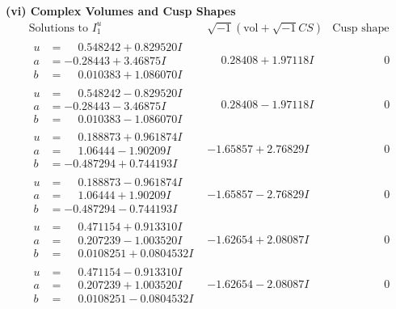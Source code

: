 \documentclass[1p]{elsarticle_modified}
\theoremstyle{definition}
\newcommand{\I}{\sqrt{-1}}
\begin{document}
\newpage\flushleft \textbf{(vi) Complex Volumes and Cusp Shapes}
$$\begin{array}{c|c|c}  
\text{Solutions to }I^u_{1}& \I (\text{vol} + \sqrt{-1}CS) & \text{Cusp shape}\\
 \hline 
\begin{aligned}
u &= \phantom{-}0.548242 + 0.829520 I \\
a &= -0.28443 + 3.46875 I \\
b &= \phantom{-}0.010383 + 1.086070 I\end{aligned}
 & \phantom{-}0.28408 + 1.97118 I & \phantom{-0.000000 } 0 \\ \hline\begin{aligned}
u &= \phantom{-}0.548242 - 0.829520 I \\
a &= -0.28443 - 3.46875 I \\
b &= \phantom{-}0.010383 - 1.086070 I\end{aligned}
 & \phantom{-}0.28408 - 1.97118 I & \phantom{-0.000000 } 0 \\ \hline\begin{aligned}
u &= \phantom{-}0.188873 + 0.961874 I \\
a &= \phantom{-}1.06444 - 1.90209 I \\
b &= -0.487294 + 0.744193 I\end{aligned}
 & -1.65857 + 2.76829 I & \phantom{-0.000000 } 0 \\ \hline\begin{aligned}
u &= \phantom{-}0.188873 - 0.961874 I \\
a &= \phantom{-}1.06444 + 1.90209 I \\
b &= -0.487294 - 0.744193 I\end{aligned}
 & -1.65857 - 2.76829 I & \phantom{-0.000000 } 0 \\ \hline\begin{aligned}
u &= \phantom{-}0.471154 + 0.913310 I \\
a &= \phantom{-}0.207239 - 1.003520 I \\
b &= \phantom{-}0.0108251 + 0.0804532 I\end{aligned}
 & -1.62654 + 2.08087 I & \phantom{-0.000000 } 0 \\ \hline\begin{aligned}
u &= \phantom{-}0.471154 - 0.913310 I \\
a &= \phantom{-}0.207239 + 1.003520 I \\
b &= \phantom{-}0.0108251 - 0.0804532 I\end{aligned}
 & -1.62654 - 2.08087 I & \phantom{-0.000000 } 0 \\ \hline\begin{aligned}

\end{aligned}
\end{array}$$
\end{document}
